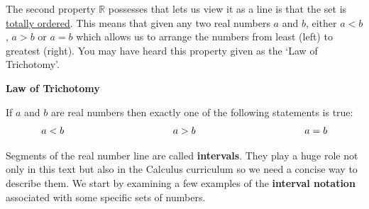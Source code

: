 \documentclass[11pt]{article}
\theoremstyle{definition}  %
\newcommand{\bbm}{\begin{boxedminipage}{6.41in}}
\newcommand{\ebm}{\end{boxedminipage}}
\begin{document}
\smallskip

The second property $\mathbb{R}$ possesses that lets us view it as a line is that the set is \href{http://en.wikipedia.org/wiki/Total_order}{\underline{totally ordered}}. This means that given any two real numbers $a$ and $b$, either $a < b$, $a > b$ or $a = b$ which allows us to arrange the numbers from least (left) to greatest (right). You may have heard this property given as the `Law of Trichotomy'.

\medskip

\label{trichotomy}

\colorbox{ResultColor}{\bbm

\centerline{\textbf{Law of Trichotomy}}

If $a$ and $b$ are real numbers then exactly one of the following statements is true: \vspace{-.15in} \[ \begin{array}{lclcl} a < b & \hspace*{1.25in} & a > b & \hspace*{1.25in} & a = b \end{array} \]

\ebm}

\medskip

Segments of the real number line are called \textbf{intervals}.  They play a huge role not only in this text but also in the Calculus curriculum so we need a concise way to describe them.  We start by examining a few examples of the \textbf{interval notation} associated with some specific sets of numbers.  
\end{document}
